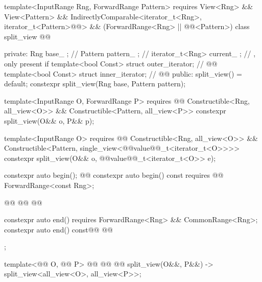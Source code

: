 {\begin{codeblock}
{  template<InputRange Rng, ForwardRange Pattern>
    requires View<Rng> && View<Pattern> &&
      IndirectlyComparable<iterator_t<Rng>, iterator_t<Pattern>@@> &&
      (ForwardRange<Rng> || @@<Pattern>)
  class split_view @@ {
  private:
    Rng base_ {};                               // \expos
    Pattern pattern_ {};                        // \expos
    iterator_t<Rng> current_ {};                // \expos, only present if 
    template<bool Const> struct outer_iterator; // \expos
    @@
    template<bool Const> struct inner_iterator; // \expos
    @@
  public:
    split_view() = default;
    constexpr split_view(Rng base, Pattern pattern);

    template<InputRange O, ForwardRange P>
      requires @@
        Constructible<Rng, all_view<O>> &&
        Constructible<Pattern, all_view<P>>
    constexpr split_view(O&& o, P&& p);

    template<InputRange O>
      requires @@
        Constructible<Rng, all_view<O>> &&
        Constructible<Pattern, single_view<@@value@@_t<iterator_t<O>>>>
    constexpr split_view(O&& o, @@value@@_t<iterator_t<O>> e);

    constexpr auto begin();
    @@
    constexpr auto begin() const
      requires @@ ForwardRange<const Rng>;

    @@
    @@
      @@

    constexpr auto end()
      requires ForwardRange<Rng> && CommonRange<Rng>;
    constexpr auto end() const@\newtxt{;}@
      @@
  };

  template<@@ O, @@ P>
    @@
      @@
      @@
  split_view(O&&, P&&) -> split_view<all_view<O>, all_view<P>>;

}
\end{codeblock}}
